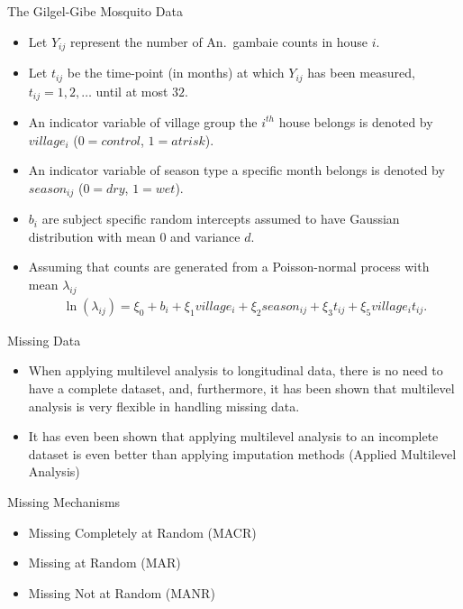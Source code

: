 \documentclass{beamer}
\begin{document}
\begin{frame}{The Gilgel-Gibe Mosquito Data}
\begin{itemize}
\item Let $Y_{ij}$ represent the number of An.~gambaie counts in house $i$.
\item Let $t_{ij}$ be the time-point (in months) at which $Y_{ij}$ has been measured, $t_{ij}= 1, 2, \ldots$ until at most $32$.
\item An indicator variable of village group the $i^{th}$ house belongs is denoted by $village_i$ ($0=control$, $1=at risk$).
\item An indicator variable of season type a specific month belongs is denoted by $season_{ij}$ ($0=dry$, $1=wet$).
\item $b_i$ are subject specific random intercepts assumed to have Gaussian distribution with mean $0$ and variance $d$.
\item Assuming that counts are generated from a Poisson-normal process with mean $\lambda_{ij}$
\normalsize\begin{eqnarray}
\ln(\lambda_{ij}) = \xi_0 + b_i +\xi_1 village_i  + \xi_2 season_{ij}  +  \xi_3 t_{ij}+ \xi_5 village_i t_{ij}. \nonumber
\end{eqnarray}
\end{itemize}
\end{frame}







\begin{frame}{Missing Data}
\begin{itemize}
\item When applying multilevel analysis to longitudinal data, there is no need to have a complete dataset, and, furthermore, it has been shown that multilevel analysis is very flexible in handling missing data. \vspace{0.5cm}
\item It has even been shown that applying multilevel analysis to an incomplete dataset is even better than applying imputation methods (Applied Multilevel Analysis)
\end{itemize}

\end{frame}

\begin{frame}{Missing Mechanisms}
\begin{itemize}
	\item Missing Completely at Random (MACR) \vspace{0.5cm}
	\item Missing at Random (MAR) \vspace{0.5cm}
	\item Missing Not at Random (MANR)
\end{itemize}
\end{frame}
\end{document}
